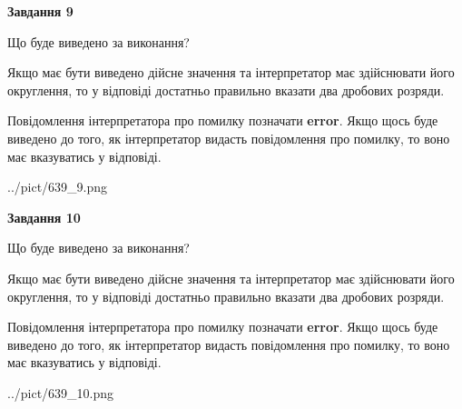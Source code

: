 \documentclass[12pt, ukrainian]{article}
\begin{document}
{\begin {Large}
{\begin {center}\textbf{Завдання 9}\end {center}}\par
Що буде виведено за виконання? \par

Якщо має бути виведено дійсне значення та інтерпретатор має здійснювати його округлення, 
то у відповіді достатньо правильно вказати два дробових розряди.

Повідомлення інтерпретатора про помилку позначати \textbf{error}.
Якщо щось буде виведено до того, як інтерпретатор видасть повідомлення про помилку, 
то воно має вказуватись у відповіді. \par

\begin{center}
	{../pict/639_9.png}
\end{center}
\newpage

{\begin {center}\textbf{Завдання 10}\end {center}}\par
Що буде виведено за виконання? \par

Якщо має бути виведено дійсне значення та інтерпретатор має здійснювати його округлення, 
то у відповіді достатньо правильно вказати два дробових розряди.

Повідомлення інтерпретатора про помилку позначати \textbf{error}.
Якщо щось буде виведено до того, як інтерпретатор видасть повідомлення про помилку, 
то воно має вказуватись у відповіді. \par

\begin{center}
	{../pict/639_10.png}
\end{center}
\newpage

\end {Large}}
\end{document}

